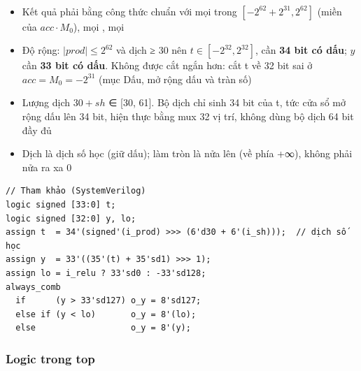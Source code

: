 \documentclass[10pt,a4paper]{article}
\begin{document}
\paragraph{}\label{par:5-4}
\begin{itemize}
\item Kết quả phải bằng công thức chuẩn với mọi  trong $[-2^{62}+2^{31}, 2^{62}]$ (miền của $acc \cdot M_0$), mọi , mọi 
\item Độ rộng: $|prod| ≤ 2^{62}$ và dịch ≥ 30 nên $t ∈ [-2^{32}, 2^{32}]$, cần \textbf{34 bit có dấu}; $y$ cần \textbf{33 bit có dấu}. Không được cắt ngắn hơn: cắt t về 32 bit sai ở $acc = M_0 = -2^{31}$ (mục Dấu, mở rộng dấu và tràn số)
\item Lượng dịch $30 + sh$ ∈ [30, 61]. Bộ dịch chỉ sinh 34 bit của t, tức cửa sổ  mở rộng dấu lên 34 bit, hiện thực bằng mux 32 vị trí, không dùng bộ dịch 64 bit đầy đủ
\item Dịch là dịch số học (giữ dấu); làm tròn là nửa lên (về phía +∞), không phải nửa ra xa 0
\end{itemize}

\begin{Verbatim}[frame=leftline,framerule=2pt,rulecolor=\color{brand},xleftmargin=6pt,samepage=true]
// Tham khảo (SystemVerilog)
logic signed [33:0] t;
logic signed [32:0] y, lo;
assign t  = 34'(signed'(i_prod) >>> (6'd30 + 6'(i_sh)));  // dịch số học
assign y  = 33'((35'(t) + 35'sd1) >>> 1);
assign lo = i_relu ? 33'sd0 : -33'sd128;
always_comb
  if      (y > 33'sd127) o_y = 8'sd127;
  else if (y < lo)       o_y = 8'(lo);
  else                   o_y = 8'(y);
\end{Verbatim}

\subsubsection{Logic trong top}\label{sec:5.3}
\end{document}
